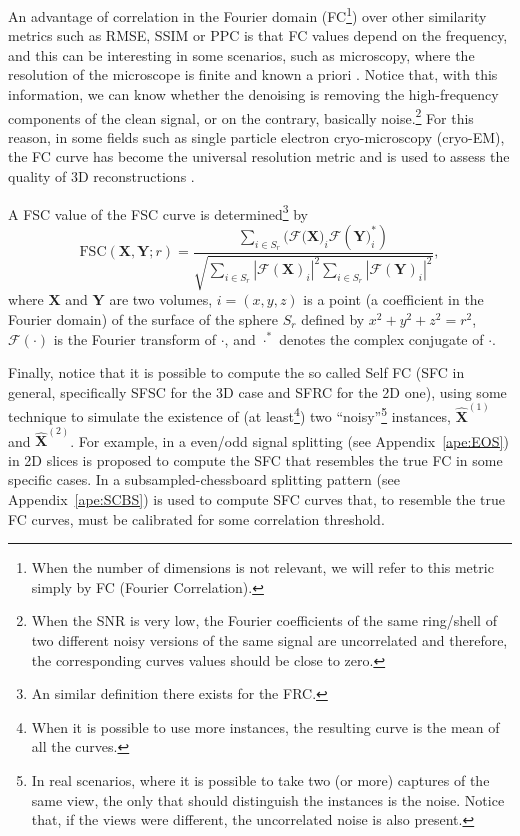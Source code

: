 \documentclass{article}
\begin{document}
An advantage of correlation in the Fourier domain (FC\footnote{When
  the number of dimensions is not relevant, we will refer to this
  metric simply by FC (Fourier Correlation).}) over other similarity
metrics such as RMSE, SSIM or PPC is that FC values depend on the
frequency, and this can be interesting in some scenarios, such as
microscopy, where the resolution of the microscope is finite and known
a priori \cite{nieuwenhuizen2013measuring}. Notice that, with this
information, we can know whether the denoising is removing the
high-frequency components of the clean signal, or on the contrary,
basically noise.\footnote{When the SNR is very low, the Fourier
  coefficients of the same ring/shell of two different noisy versions
  of the same signal are uncorrelated and therefore, the corresponding
  curves values should be close to zero.}  For this reason, in some
fields such as single particle electron cryo-microscopy (cryo-EM), the
FC curve has become the universal resolution metric and is used to
assess the quality of 3D reconstructions
\cite{rosenthal2003optimal,scheres2012prevention}.

A FSC value of the FSC curve is determined\footnote{An similar
  definition there exists for the FRC.} by~\cite{verbeke2024self}
\begin{equation}
\text{FSC}(\mathbf{X}, \mathbf{Y}; r) = \frac{\sum_{i \in S_r} (\mathcal{F}(\mathbf{X)}_i \mathcal{F}(\mathbf{Y)}_i^*)}{\sqrt{\sum_{i \in S_r} |\mathcal{F}(\mathbf{X})_i|^2 \sum_{i \in S_r} |\mathcal{F}(\mathbf{Y})_i|^2}},
\end{equation}
where $\mathbf{X}$ and $\mathbf{Y}$ are two volumes, $i=(x, y, z)$ is
a point (a coefficient in the Fourier domain) of the surface of the
sphere $S_r$ defined by $x^2+y^2+z^2=r^2$, $\mathcal{F}(\cdot)$ is the
Fourier transform of $\cdot$, and $\cdot^*$ denotes the complex
conjugate of $\cdot$.

Finally, notice that it is possible to compute the so called Self FC
(SFC in general, specifically SFSC for the 3D case and SFRC for the 2D
one), using some technique to simulate the existence of (at
least\footnote{When it is possible to use more instances, the
  resulting curve is the mean of all the curves.}) two
``noisy''\footnote{In real scenarios, where it is possible to take two
  (or more) captures of the same view, the only that should
  distinguish the instances is the noise. Notice that, if the views
  were different, the uncorrelated noise is also present.} instances,
$\hat{\mathbf{X}}^{(1)}$ and $\hat{\mathbf{X}}^{(2)}$. For example, in
\cite{verbeke2024self} a even/odd signal splitting (see
Appendix~\ref{ape:EOS}) in 2D slices is proposed to compute the SFC
that resembles the true FC in some specific cases. In
\cite{koho2019fourier} a subsampled-chessboard splitting pattern (see
Appendix~\ref{ape:SCBS}) is used to compute SFC curves that, to
resemble the true FC curves, must be calibrated for some correlation
threshold.
\end{document}
